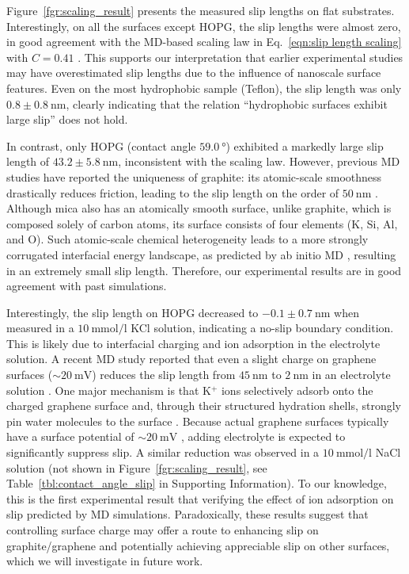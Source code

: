 \documentclass[journal=jacsat,manuscript=article]{achemso}
\begin{document}
Figure~\ref{fgr:scaling_result} presents the measured slip lengths on flat substrates. Interestingly, on all the surfaces except HOPG, the slip lengths were almost zero, in good agreement with the MD-based scaling law in Eq.~\ref{eqn:slip length scaling} with \(C = 0.41\) \cite{Huang2008-xu}. This supports our interpretation that earlier experimental studies may have overestimated slip lengths due to the influence of nanoscale surface features. Even on the most hydrophobic sample (Teflon), the slip length was only \(0.8 \pm \SI{0.8}{\nano\metre}\), clearly indicating that the relation ``hydrophobic surfaces exhibit large slip'' does not hold.

In contrast, only HOPG (contact angle \(\SI{59.0}{\degree}\)) exhibited a markedly large slip length of \(43.2 \pm \SI{5.8}{\nano\metre}\), inconsistent with the scaling law. However, previous MD studies have reported the uniqueness of graphite: its atomic-scale smoothness drastically reduces friction, leading to the slip length on the order of \(\SI{50}{\nano\metre}\) \cite{Wagemann2017-bk, Kannam2012-jx}. Although mica also has an atomically smooth surface, unlike graphite, which is composed solely of carbon atoms, its surface consists of four elements (K, Si, Al, and O). Such atomic-scale chemical heterogeneity leads to a more strongly corrugated interfacial energy landscape, as predicted by ab initio MD \cite{Tocci2014-es}, resulting in an extremely small slip length. Therefore, our experimental results are in good agreement with past simulations. 

Interestingly, the slip length on HOPG decreased to \(-0.1 \pm \SI{0.7}{\nano\metre}\) when measured in a \(\SI{10}{\milli\mole\per\litre}\) KCl solution, indicating a no-slip boundary condition. This is likely due to interfacial charging and ion adsorption in the electrolyte solution. A recent MD study reported that even a slight charge on graphene surfaces (\(\sim\SI{20}{\milli\volt}\)) reduces the slip length from \(\SI{45}{\nano\metre}\) to \(\SI{2}{\nano\metre}\) in an electrolyte solution \cite{Xie2020-as}. One major mechanism is that K\(^+\) ions selectively adsorb onto the charged graphene surface and, through their structured hydration shells, strongly pin water molecules to the surface \cite{Mu2021-wm}. Because actual graphene surfaces typically have a surface potential of \(\sim\SI{20}{\milli\volt}\) \cite{Paruchuri2004-iu}, adding electrolyte is expected to significantly suppress slip. A similar reduction was observed in a \(\SI{10}{\milli\mole\per\litre}\) NaCl solution (not shown in Figure~\ref{fgr:scaling_result}, see Table~\ref{tbl:contact_angle_slip} in Supporting Information). To our knowledge, this is the first experimental result that verifying the effect of ion adsorption on slip predicted by MD simulations. Paradoxically, these results suggest that controlling surface charge may offer a route to enhancing slip on graphite/graphene and potentially achieving appreciable slip on other surfaces, which we will investigate in future work.
\end{document}
